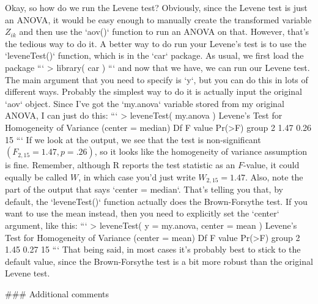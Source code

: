 Okay, so how do we run the Levene test? Obviously, since the Levene test is just an ANOVA, it would be easy enough to manually create the transformed variable $Z_{ik}$ and then use the `aov()` function to run an ANOVA on that. However, that's the tedious way to do it. A better way to do run your Levene's test is to use the `leveneTest()` function, which is in the `car` package.  As usual, we first load the package
```
> library( car )  
```
and now that we have, we can run our Levene test. The main argument that you need to specify is `y`, but you can do this in lots of different ways. Probably the simplest way to do it is actually input the original `aov` object. Since I've got the `my.anova` variable stored from my original ANOVA, I can just do this:
```
> leveneTest( my.anova )
Levene's Test for Homogeneity of Variance (center = median)
      Df F value Pr(>F)
group  2    1.47   0.26
      15   
```
If we look at the output, we see that the test is non-significant $(F_{2,15} = 1.47, p = .26)$, so it looks like the homogeneity of variance assumption is fine. Remember, although R reports the test statistic as an $F$-value, it could equally be called $W$, in which case you'd just write $W_{2,15} = 1.47$. Also, note the part of the output that says `center = median`. That's telling you that, by default, the `leveneTest()` function actually does the Brown-Forsythe test. If you want to use the mean instead, then you need to explicitly set the `center` argument, like this:
```
> leveneTest( y = my.anova, center = mean )  
Levene's Test for Homogeneity of Variance (center = mean)
      Df F value Pr(>F)
group  2    1.45   0.27
      15 
```
That being said, in most cases it's probably best to stick to the default value, since the Brown-Forsythe test is a bit more robust than the original Levene test.

### Additional comments

